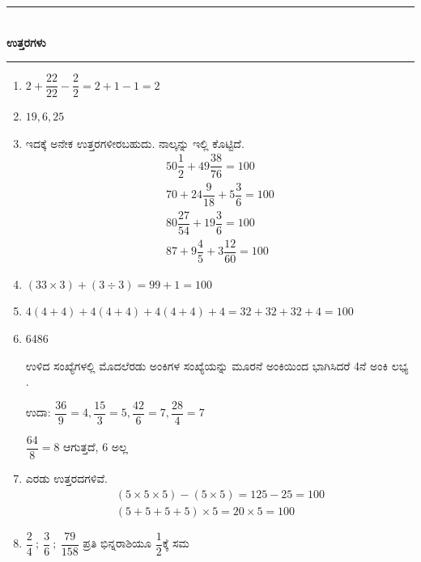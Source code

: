 \medskip

\begin{center}
\rule{5cm}{1pt}\\[3pt]
{\Large\bfseries ಉತ್ತರಗಳು}\\[-0.1cm]
\rule{5cm}{1pt}
\end{center}

\begin{enumerate}
\itemsep=5pt

\item $2 + \dfrac{22}{22} - \dfrac{2}{2} = 2 + 1 - 1 = 2$

\item $19, 6, 25$

\eject

\item ಇದಕ್ಕೆ ಅನೇಕ ಉತ್ತರಗಳೀರಬಹುದು. ನಾಲ್ಕನ್ನು ಇಲ್ಲಿ ಕೊಟ್ಟಿದೆ. 
\begin{gather*}
50\dfrac{1}{2} + 49\dfrac{38}{76} = 100\\[0.1cm]
70 + 24\dfrac{9}{18} + 5\dfrac{3}{6} = 100\\[0.1cm]
80\dfrac{27}{54} + 19\dfrac{3}{6} = 100\\[0.1cm]
87 + 9\dfrac{4}{5} + 3\dfrac{12}{60} = 100
\end{gather*}

\item $(33\times 3) + (3\div 3) = 99 + 1 = 100$

\item $4 (4+4) + 4(4+4) + 4(4+4) + 4 = 32 + 32 + 32 + 4 = 100$

\item 6486

ಉಳಿದ ಸಂಖ್ಯೆಗಳಲ್ಲಿ ಮೊದಲೆರಡು ಅಂಕಿಗಳ ಸಂಖ್ಯೆಯನ್ನು ಮೂರನೆ ಅಂಕಿಯಿಂದ ಭಾಗಿಸಿದರೆ 4ನೆ ಅಂಕಿ ಲಭ್ಯ .

\vskip 0.1cm

ಉದಾ: $\dfrac{36}{9} = 4, \dfrac{15}{3} = 5, \dfrac{42}{6} = 7, \dfrac{28}{4} = 7$

\vskip 0.1cm

$\dfrac{64}{8} = 8$ ಆಗುತ್ತದೆ, $6$ ಅಲ್ಲ 

\item ಎರಡು ಉತ್ತರದಗಳಿವೆ. 
\begin{gather*}
(5\times 5\times 5) - (5\times 5) = 125 - 25 = 100\\
(5+5+5+5)\times 5 = 20\times 5 = 100
\end{gather*}

\vskip 0.1cm

\item $\dfrac{2}{4} ~;~ \dfrac{3}{6} ~;~ \dfrac{79}{158}$ ಪ್ರತಿ ಭಿನ್ನರಾಶಿಯೂ $\dfrac{1}{2}$ಕ್ಕೆ ಸಮ 


\end{enumerate}
